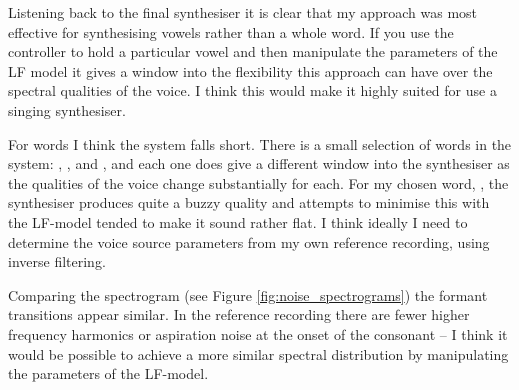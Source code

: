 Listening back to the final synthesiser it is clear that my approach was most effective for synthesising vowels rather than a whole word. If you use the controller to hold a particular vowel and then manipulate the parameters of the LF model it gives a window into the flexibility this approach can have over the spectral qualities of the voice. I think this would make it highly suited for use a singing synthesiser.

For words I think the system falls short. There is a small selection of words in the system: , , and , and each one does give a different window into the synthesiser as the qualities of the voice change substantially for each. For my chosen word, , the synthesiser produces quite a buzzy quality and attempts to minimise this with the LF-model tended to make it sound rather flat. I think ideally I need to determine the voice source parameters from my own reference recording, using inverse filtering.

Comparing the spectrogram (see Figure \ref{fig:noise_spectrograms}) the formant transitions appear similar. In the reference recording there are fewer higher frequency harmonics or aspiration noise at the onset of the  consonant – I think it would be possible to achieve a more similar spectral distribution by manipulating the parameters of the LF-model.


